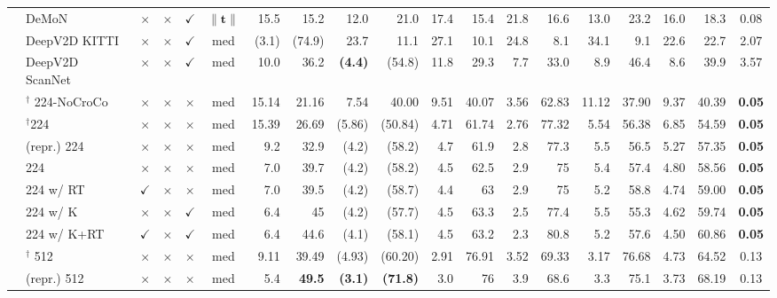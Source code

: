 \begin{table}
\begin{center}
{\begin{tabular}{llccccrrrrrrrrrrrrc}
\multirow{3}{*}{} & DeMoN~\cite{ummenhofer2017demon} &$\times$&$\times$ &$\checkmark$& $\|\mathbf{t}\|$ & 15.5 & 15.2 & 12.0 & 21.0 & 17.4 & 15.4 & 21.8 & 16.6 & 13.0 & 23.2 & 16.0 & 18.3 & 0.08 \\
& DeepV2D KITTI~\cite{teed2020deepv2d} &$\times$&$\times$&$\checkmark$&med& (3.1) & (74.9) & 23.7 & 11.1 & 27.1 & 10.1 & 24.8 & 8.1 & 34.1 & 9.1 & 22.6 & 22.7 & 2.07 \\
& DeepV2D ScanNet~\cite{teed2020deepv2d} &$\times$&$\times$&$\checkmark$& med &10.0 & 36.2 &\bf{(4.4)} & (54.8) & 11.8 & 29.3 & 7.7 & 33.0 & 8.9 & 46.4 & 8.6 & 39.9 & 3.57  \\
\cmidrule{2-19}
& \duster{}$^\dagger$ 224-NoCroCo &$\times$&$\times$&$\times$&med& 15.14&21.16 & 7.54&40.00 & 9.51&40.07 & 3.56&62.83 & 11.12&37.90 & 9.37 & 40.39 & \textbf{0.05} \\


 & \duster{}$^\dagger$224~\cite{wang2024dust3r} & $\times$ & $\times$ & $\times$ &              med & 15.39 & 26.69 &  (5.86) & (50.84) & 4.71 & 61.74 & 2.76 & 77.32 & 5.54 & 56.38 & 6.85 & 54.59 & \textbf{0.05} \tabularnewline
& \duster{}(repr.) 224~\cite{wang2024dust3r} & $\times$ & $\times$ & $\times$ &              med & 9.2 & 32.9 & (4.2) & (58.2) & 4.7 & 61.9 & 2.8 & 77.3 & 5.5 & 56.5 & 5.27 & 57.35 & \textbf{0.05}\tabularnewline

 & \ours{} 224 & $\times$ & $\times$ & $\times$ &               med & 7.0 & 39.7 & (4.2) & (58.2) & 4.5 & 62.5 & 2.9 & 75 & 5.4 & 57.4 & 4.80 & 58.56 & \textbf{0.05}\\
 & \ours{} 224 w/ RT & $\checkmark$ & $\times$ & $\times$  &      med & 7.0 & 39.5 & (4.2) & (58.7) & 4.4 & 63 & 2.9 & 75 & 5.2 & 58.8 & 4.74 & 59.00 & \textbf{0.05}\\
 & \ours{} 224 w/ K  & $\times$ & $\times$ & $\checkmark$ &med & 6.4 & 45 & (4.2) & (57.7) & 4.5 & 63.3 & 2.5 & 77.4 & 5.5 & 55.3 & 4.62 & 59.74 & \textbf{0.05}\\
 & \ours{} 224 w/ K+RT & $\checkmark$ & $\times$ & $\checkmark$ &   med & 6.4 & 44.6 & (4.1) & (58.1) & 4.5 & 63.2 & 2.3 & 80.8 & 5.2 & 57.6 & 4.50 & 60.86 & \textbf{0.05}\\

 & \duster{}$^\dagger$ 512~\cite{wang2024dust3r} & $\times$ & $\times$ & $\times$ &              med & 9.11 & 39.49 &  (4.93) & (60.20) & 2.91 & 76.91 & 3.52 & 69.33 & 3.17 & 76.68 & 4.73 & 64.52 & 0.13\tabularnewline
 & \duster{}(repr.) 512~\cite{wang2024dust3r} & $\times$ & $\times$ & $\times$ &              med & 5.4 & \bf 49.5 & \bf (3.1) & \bf (71.8) & 3.0 & 76 & 3.9 & 68.6 & 3.3 & 75.1 & 3.73 & 68.19 & 0.13\tabularnewline


\end{tabular}}
\end{center}
\end{table}
